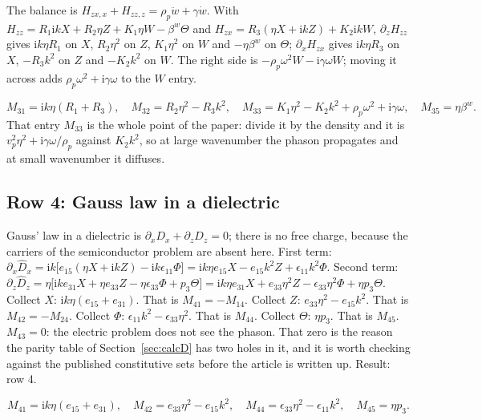 \documentclass[11pt]{article}
\makeatletter
\newif\ifshowworked
\newenvironment{worked}{%
  \ifshowworked\par\smallskip\noindent\textit{Working.}\par\smallskip\else
  \setbox\z@\vbox\bgroup\fi}{\ifshowworked\par\smallskip\else\egroup\fi}
\newcommand{\ii}{\mathrm{i}}
\makeatother
\begin{document}
\begin{worked}
The balance is $H_{zx,x}+H_{zz,z}=\rho_p\ddot w+\gamma\dot w$. With
$H_{zz}=R_1\ii kX+R_2\eta Z+K_1\eta W-\beta^{w}\Theta$ and
$H_{zx}=R_3(\eta X+\ii kZ)+K_2\ii kW$,
$\partial_zH_{zz}$ gives $\ii k\eta R_1$ on $X$, $R_2\eta^2$ on $Z$, $K_1\eta^2$ on $W$ and
$-\eta\beta^{w}$ on $\Theta$;
$\partial_xH_{zx}$ gives $\ii k\eta R_3$ on $X$, $-R_3k^2$ on $Z$ and $-K_2k^2$ on $W$.
The right side is $-\rho_p\omega^2W-\ii\gamma\omega W$; moving it across adds $\rho_p\omega^2+\ii\gamma\omega$
to the $W$ entry.
\end{worked}

\begin{equation}
M_{31}=\ii k\eta(R_1+R_3),\quad
M_{32}=R_2\eta^2-R_3k^2,\quad
M_{33}=K_1\eta^2-K_2k^2+\rho_p\omega^2+\ii\gamma\omega,\quad
M_{35}=\eta\beta^{w}.
\end{equation}
That entry $M_{33}$ is the whole point of the paper: divide it by the density and it is
$v_p^2\eta^2+\ii\gamma\omega/\rho_p$ against $K_2k^2$, so at large wavenumber the phason propagates and at
small wavenumber it diffuses.

\subsection*{Row 4: Gauss law in a dielectric}

\begin{worked}
Gauss' law in a dielectric is $\partial_xD_x+\partial_zD_z=0$; there is no free charge, because the
carriers of the semiconductor problem are absent here.
First term: $\partial_x\hat D_x=\ii k\bigl[e_{15}(\eta X+\ii kZ)-\ii k\epsilon_{11}\Phi\bigr]
=\ii k\eta e_{15}X-e_{15}k^2Z+\epsilon_{11}k^2\Phi$.
Second term: $\partial_z\hat D_z=\eta\bigl[\ii ke_{31}X+\eta e_{33}Z-\eta\epsilon_{33}\Phi+p_3\Theta\bigr]
=\ii k\eta e_{31}X+e_{33}\eta^2Z-\epsilon_{33}\eta^2\Phi+\eta p_3\Theta$.
Collect $X$: $\ii k\eta(e_{15}+e_{31})$. That is $M_{41}=-M_{14}$.
Collect $Z$: $e_{33}\eta^2-e_{15}k^2$. That is $M_{42}=-M_{24}$.
Collect $\Phi$: $\epsilon_{11}k^2-\epsilon_{33}\eta^2$. That is $M_{44}$.
Collect $\Theta$: $\eta p_3$. That is $M_{45}$.
$M_{43}=0$: the electric problem does not see the phason. That zero is the reason the parity table of
Section~\ref{sec:calcD} has two holes in it, and it is worth checking against the published constitutive
sets before the article is written up.
Result: row 4.
\end{worked}

\begin{equation}
M_{41}=\ii k\eta(e_{15}+e_{31}),\quad
M_{42}=e_{33}\eta^2-e_{15}k^2,\quad
M_{44}=\epsilon_{33}\eta^2-\epsilon_{11}k^2,\quad
M_{45}=\eta p_3 .
\end{equation}
\end{document}
